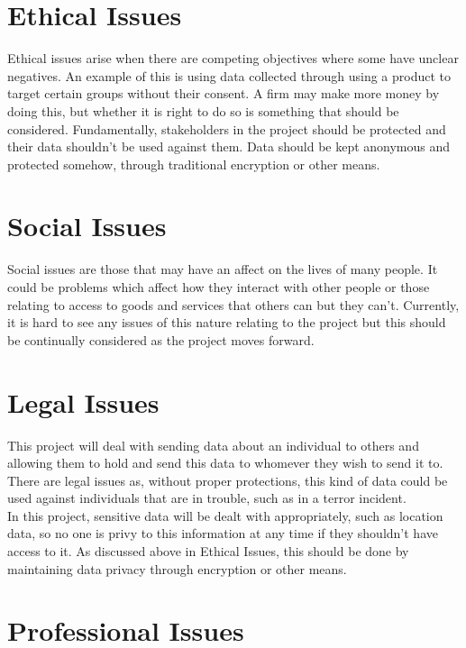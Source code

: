 \documentclass{report}
\begin{document}
\section*{Ethical Issues}

Ethical issues arise when there are competing objectives  where some have unclear negatives. An example of this 
is using data collected through using a product to target certain groups without their consent. 
A firm may make more money by doing this, but whether it is right to do so is something that 
should be considered. Fundamentally, stakeholders in the project should be protected and their 
data shouldn't be used against them. Data should be kept anonymous and protected somehow, through 
traditional encryption or other means. 

\section*{Social Issues}

Social issues are those that may have an affect on the lives of many people. It could be problems which 
affect how they interact with other people or those relating to access to goods and services that others can 
but they can't. Currently, it is hard to see any issues of this nature relating to the project but this should 
be continually considered as the project moves forward.

\section*{Legal Issues}

This project will deal with sending data about an individual to others and allowing them to hold and send this 
data to whomever they wish to send it to. There are legal issues as, without proper protections, this kind of 
data could be used against individuals that are in trouble, such as in a terror incident. 
\bigskip
\\
In this project, sensitive data will be dealt with appropriately, such as location data, so no one is privy to this 
information at any time if they shouldn't have access to it. As discussed above in Ethical Issues, this should be 
done by maintaining data privacy through encryption or other means.

\section*{Professional Issues}
\end{document}
